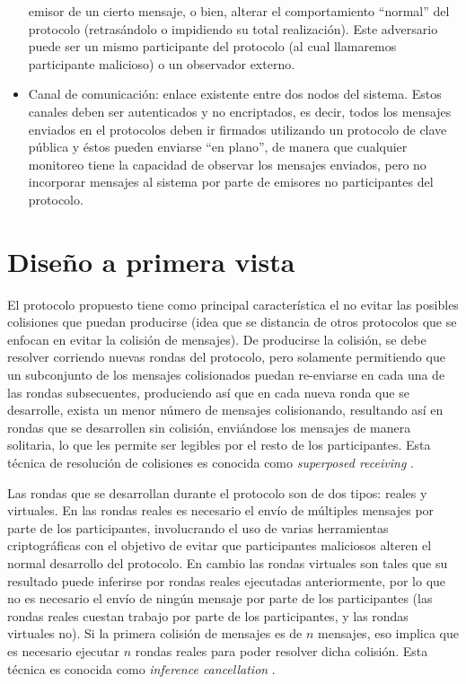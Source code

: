 \begin{itemize}
    emisor de un cierto mensaje, o bien, alterar el comportamiento ``normal'' 
    del protocolo (retrasándolo o impidiendo su total realización). Este 
    adversario puede ser un mismo participante del protocolo (al cual 
    llamaremos participante malicioso) o un observador externo.
    \item Canal de comunicación: enlace existente entre dos nodos del 
    sistema. Estos canales deben ser autenticados y no encriptados, es decir, todos los mensajes 
    enviados en el protocolos deben ir firmados utilizando un protocolo 
    de clave pública y éstos pueden enviarse ``en plano'', de manera que cualquier 
    monitoreo tiene la capacidad de observar los mensajes enviados, pero no 
    incorporar mensajes al sistema por parte de emisores no participantes del 
    protocolo.
\end{itemize}

\section{Diseño a primera vista}

El protocolo propuesto tiene como principal característica el no evitar las 
posibles colisiones que puedan producirse (idea que se distancia de otros protocolos 
que se enfocan en evitar la colisión de mensajes). De producirse la colisión, se 
debe resolver corriendo nuevas rondas del protocolo, pero solamente permitiendo 
que un subconjunto de los mensajes colisionados puedan re-enviarse en cada una 
de las rondas subsecuentes, produciendo así que en cada nueva ronda que se 
desarrolle, exista un menor número de mensajes colisionando, resultando así 
en rondas que se desarrollen sin colisión, enviándose los mensajes de manera 
solitaria, lo que les permite ser legibles por el resto de los participantes. 
Esta técnica de resolución de colisiones es conocida como \emph{superposed receiving} 
\cite{franck2014dining}.

Las rondas que se desarrollan durante el protocolo son de dos tipos: reales y virtuales. 
En las rondas reales es necesario el envío de múltiples mensajes por parte de los participantes, 
involucrando el uso de varias herramientas criptográficas con el objetivo 
de evitar que participantes maliciosos alteren el normal desarrollo del protocolo. En cambio 
las rondas virtuales son tales que su resultado puede inferirse por rondas 
reales ejecutadas anteriormente, por lo que no es necesario el envío de 
ningún mensaje por parte de los participantes (las rondas reales cuestan trabajo por 
parte de los participantes, y las rondas virtuales no). Si la primera colisión 
de mensajes es de $n$ mensajes, eso implica que es necesario ejecutar $n$ rondas 
reales para poder resolver dicha colisión. 
Esta técnica es conocida como \emph{inference cancellation} \cite{yu2005sicta}.

